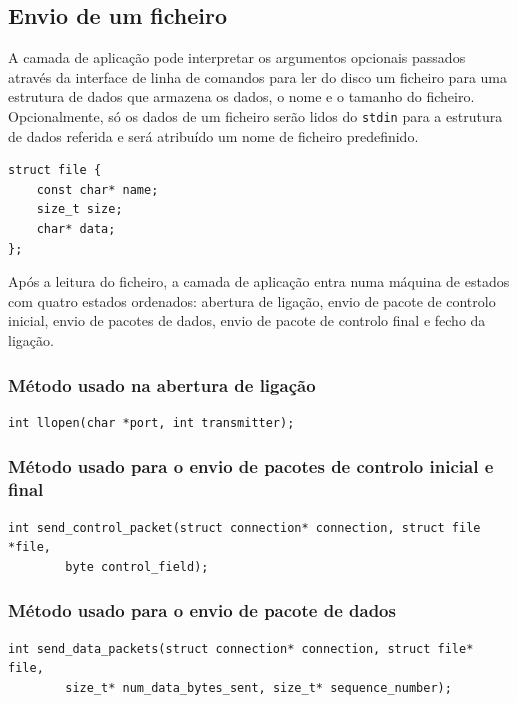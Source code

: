 \documentclass[a4paper,11pt,titlepage]{article}
\begin{document}
\subsection{Envio de um ficheiro}
A camada de aplicação pode interpretar os argumentos opcionais passados através da interface de linha de comandos para ler do disco um ficheiro para uma estrutura de dados que armazena os dados, o nome e o tamanho do ficheiro. Opcionalmente, só os dados de um ficheiro serão lidos do \texttt{stdin} para a estrutura de dados referida e será atribuído um nome de ficheiro predefinido.

\begin{lstlisting}[style=customc]
struct file {
    const char* name;
    size_t size;
    char* data;
};
\end{lstlisting}

Após a leitura do ficheiro, a camada de aplicação entra numa máquina de estados com quatro estados ordenados: abertura de ligação, envio de pacote de controlo inicial, envio de pacotes de dados, envio de pacote de controlo final e fecho da ligação.

\subsubsection*{Método usado na abertura de ligação}

\begin{lstlisting}[style=customc]
int llopen(char *port, int transmitter);
\end{lstlisting}

\subsubsection*{Método usado para o envio de pacotes de controlo inicial e final}
\begin{lstlisting}[style=customc]
int send_control_packet(struct connection* connection, struct file *file,
        byte control_field);
\end{lstlisting}

\subsubsection*{Método usado para o envio de pacote de dados}
\begin{lstlisting}[style=customc]
int send_data_packets(struct connection* connection, struct file* file,
        size_t* num_data_bytes_sent, size_t* sequence_number);
\end{lstlisting}
\end{document}
